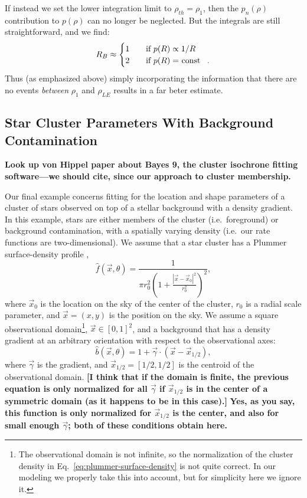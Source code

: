 \documentclass[aps,prd]{revtex4-1}
\newcommand{\ilya}[1]{{\color{red} \bf #1}}
\newcommand{\will}[1]{{\color{blue} \bf #1}}
\newcommand{\be}{\begin{equation}}
\newcommand{\ee}{\end{equation}}
\begin{document}
If instead we set the lower integration limit to $\rho_{th} = \rho_1$, then the $p_n(\rho)$
contribution to $p(\rho)$ can no longer be neglected.  But the integrals are still 
straightforward, and we find:
 \be\label{eq:rb3}
R_B \approx 
\begin{cases}
1 \ \ \  & \text{if $p(R) \propto 1/R$} \\
2  \ \ \ & \text{if $p(R) =$ const \, .} 
\end{cases}
\ee
\noindent Thus (as emphasized above) simply incorporating the information that there are no events {\it between} $\rho_1$ and  $\rho_{LE}$ results in a far beter estimate.

\subsection{Star Cluster Parameters With Background Contamination}
\label{sec:star-cluster}

\will{Look up von Hippel paper about Bayes 9, the cluster isochrone
  fitting software---we should cite, since our approach to cluster
  membership.}

Our final example concerns fitting for the location and shape
parameters of a cluster of stars observed on top of a stellar
background with a density gradient.  In this example, stars are either
members of the cluster (i.e.~foreground) or background contamination,
with a spatially varying density (i.e.~our rate functions are
two-dimensional).  We assume that a star cluster has a Plummer
surface-density profile \citep{Plummer1911,Aarseth1974},
\begin{equation}
  \label{eq:plummer-surface-density}
  \hat{f}(\vec{x}, \theta) = \frac{1}{\pi r_0^2 \left( 1 +
    \frac{\left| \vec{x} - \vec{x}_0 \right|^2}{r_0^2} \right)^2},
\end{equation}
where $\vec{x}_0$ is the location on the sky of the center of the
cluster, $r_0$ is a radial scale parameter, and $\vec{x} = \left( x, y
\right)$ is the position on the sky.  We assume a square observational
domain\footnote{The observational domain is not infinite, so the
  normalization of the cluster density in
  Eq.~\eqref{eq:plummer-surface-density} is not quite correct.  In our
  modeling we properly take this into account, but for simplicity here
  we ignore it.}, $\vec{x} \in [0,1]^2$, and a background that has a
density gradient at an arbitrary orientation with respect to the
observational axes:
\begin{equation}
  \hat{b}\left(\vec{x}, \theta\right) = 1 + \vec{\gamma} \cdot \left(
  \vec{x} - \vec{x}_{1/2} \right),
\end{equation}
where $\vec{\gamma}$ is the gradient, and $\vec{x}_{1/2} = [1/2, 1/2]$
is the centroid of the observational domain.  \ilya{[I think that if
    the domain is finite, the previous equation is only normalized for
    all $\vec{\gamma}$ if $\vec{x}_{1/2}$ is in the center of a
    symmetric domain (as it happens to be in this case).]}  \will{Yes,
  as you say, this function is only normalized for $\vec{x}_{1/2}$ is
  the center, and also for small enough $\vec{\gamma}$; both of these
  conditions obtain here.}
\end{document}

